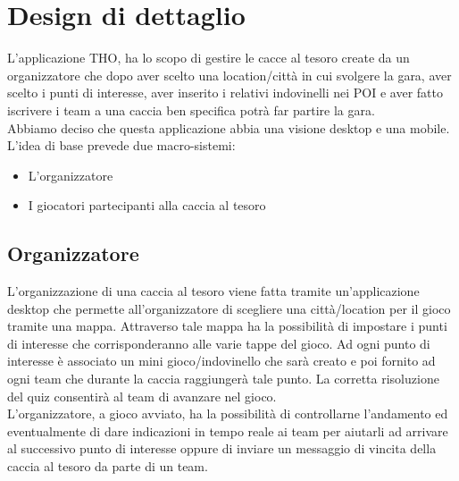 \documentclass[12pt, italian]{article}
\begin{document}
\section{Design di dettaglio}
L'applicazione THO, ha lo scopo di gestire le cacce al tesoro create da un organizzatore che dopo aver scelto una location/città in cui svolgere la gara, aver scelto i punti di interesse, aver inserito i relativi indovinelli nei POI e aver fatto iscrivere i team a una caccia ben specifica potrà far partire la gara.
\\Abbiamo deciso che questa applicazione abbia una visione desktop e una mobile.
L’idea di base prevede due macro-sistemi:
\begin{itemize}
	\item L'organizzatore
	\item I giocatori partecipanti alla caccia al tesoro
\end{itemize}
\subsection{Organizzatore}
L’organizzazione di una caccia al tesoro viene fatta tramite un’applicazione desktop che permette all'organizzatore di scegliere una città/location per il gioco tramite una mappa. Attraverso tale mappa ha la possibilità di impostare i punti di interesse che corrisponderanno alle varie tappe del gioco. Ad ogni punto di interesse è associato un mini gioco/indovinello che sarà creato e poi fornito ad ogni team che durante la caccia raggiungerà tale punto. La corretta risoluzione del quiz consentirà al team di avanzare nel gioco.\\
L'organizzatore, a gioco avviato, ha la possibilità di controllarne l'andamento ed eventualmente di dare indicazioni in tempo reale ai team per aiutarli ad arrivare al successivo punto di interesse oppure di inviare un messaggio di vincita della caccia al tesoro da parte di un team.\\
\end{document}

